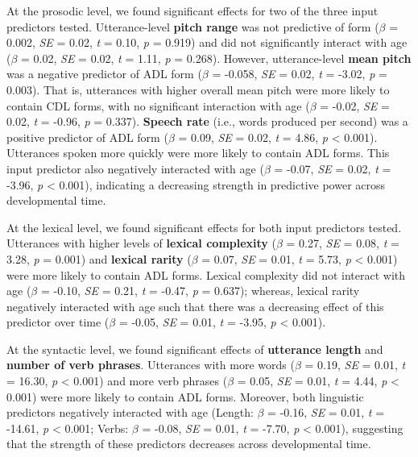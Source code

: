 \documentclass[10pt, letterpaper]{article}
\begin{document}
At the prosodic level, we found significant effects for two of the three
input predictors tested. Utterance-level \textbf{pitch range} was not
predictive of form (\(\beta\) = 0.002, \emph{SE} = 0.02, \emph{t} =
0.10, \emph{p} = 0.919) and did not significantly interact with age
(\(\beta\) = 0.02, \emph{SE} = 0.02, \emph{t} = 1.11, \emph{p} = 0.268).
However, utterance-level \textbf{mean pitch} was a negative predictor of
ADL form (\(\beta\) = -0.058, \emph{SE} = 0.02, \emph{t} = -3.02,
\emph{p} = 0.003). That is, utterances with higher overall mean pitch
were more likely to contain CDL forms, with no significant interaction
with age (\(\beta\) = -0.02, \emph{SE} = 0.02, \emph{t} = -0.96,
\emph{p} = 0.337). \textbf{Speech rate} (i.e., words produced per
second) was a positive predictor of ADL form (\(\beta\) = 0.09,
\emph{SE} = 0.02, \emph{t} = 4.86, \emph{p} \textless{} 0.001).
Utterances spoken more quickly were more likely to contain ADL forms.
This input predictor also negatively interacted with age (\(\beta\) =
-0.07, \emph{SE} = 0.02, \emph{t} = -3.96, \emph{p} \textless{} 0.001),
indicating a decreasing strength in predictive power across
developmental time.

At the lexical level, we found significant effects for both input
predictors tested. Utterances with higher levels of \textbf{lexical
complexity} (\(\beta\) = 0.27, \emph{SE} = 0.08, \emph{t} = 3.28,
\emph{p} = 0.001) and \textbf{lexical rarity} (\(\beta\) = 0.07,
\emph{SE} = 0.01, \emph{t} = 5.73, \emph{p} \textless{} 0.001) were more
likely to contain ADL forms. Lexical complexity did not interact with
age (\(\beta\) = -0.10, \emph{SE} = 0.21, \emph{t} = -0.47, \emph{p} =
0.637); whereas, lexical rarity negatively interacted with age such that
there was a decreasing effect of this predictor over time (\(\beta\) =
-0.05, \emph{SE} = 0.01, \emph{t} = -3.95, \emph{p} \textless{} 0.001).

At the syntactic level, we found significant effects of
\textbf{utterance length} and \textbf{number of verb phrases}.
Utterances with more words (\(\beta\) = 0.19, \emph{SE} = 0.01, \emph{t}
= 16.30, \emph{p} \textless{} 0.001) and more verb phrases (\(\beta\) =
0.05, \emph{SE} = 0.01, \emph{t} = 4.44, \emph{p} \textless{} 0.001)
were more likely to contain ADL forms. Moreover, both linguistic
predictors negatively interacted with age (Length: \(\beta\) = -0.16,
\emph{SE} = 0.01, \emph{t} = -14.61, \emph{p} \textless{} 0.001; Verbs:
\(\beta\) = -0.08, \emph{SE} = 0.01, \emph{t} = -7.70, \emph{p}
\textless{} 0.001), suggesting that the strength of these predictors
decreases across developmental time.
\end{document}
